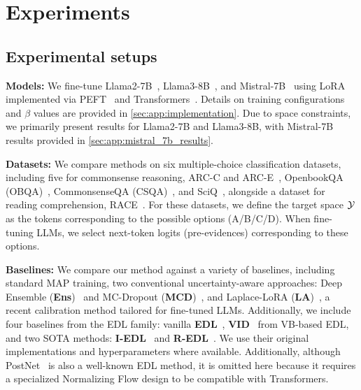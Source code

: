 \section{Experiments}

\subsection{Experimental setups} \label{sec:exp_setups}

\textbf{Models:} We fine-tune Llama2-7B~\citep{touvron2023llama}, Llama3-8B~\citep{dubey2024llama3herdmodels}, and Mistral-7B~\citep{jiang2023mistral7b} using LoRA~\citep{hu2022lora} implemented via PEFT~\citep{mangrulkar2022peft} and Transformers~\citep{wolf2020transformers}. Details on training configurations and $\beta$ values are provided in \cref{sec:app:implementation}. Due to space constraints, we primarily present results for Llama2-7B and Llama3-8B, with Mistral-7B results provided in \cref{sec:app:mistral_7b_results}.

\textbf{Datasets:} We compare methods on six multiple-choice classification datasets, including five for commonsense reasoning, ARC-C and ARC-E~\citep{clark2018arc}, OpenbookQA (OBQA)~\citep{mihaylov2018obqa}, CommonsenseQA (CSQA)~\citep{talmor2019commonsenseqa}, and SciQ~\citep{welbl2017sciq}, alongside a dataset for reading comprehension, RACE~\citep{lai2017race}. For these datasets, we define the target space $\mathcal{Y}$ as the tokens corresponding to the possible options (A/B/C/D). When fine-tuning LLMs, we select next-token logits (pre-evidences) corresponding to these options.

\textbf{Baselines:} We compare our method against a variety of baselines, including standard MAP training, two conventional uncertainty-aware approaches: Deep Ensemble (\textbf{Ens})~\citep{lakshminarayanan2017simple,fort2019deep} and MC-Dropout (\textbf{MCD})~\citep{gal2016dropout}, and Laplace-LoRA (\textbf{LA})~\citep{yang2024lalora}, a recent calibration method tailored for fine-tuned LLMs. Additionally, we include four baselines from the EDL family: vanilla \textbf{EDL}~\citep{sensoy2018evidential}, \textbf{VID}~\citep{chen2018variational} from VB-based EDL, and two SOTA methods: \textbf{I-EDL}~\citep{deng2023uncertainty} and \textbf{R-EDL}~\citep{chen2024redl}. We use their original implementations and hyperparameters where available. Additionally, although PostNet~\citep{charpentier2020posterior} is also a well-known EDL method, it is omitted here because it requires a specialized Normalizing Flow design to be compatible with Transformers.



